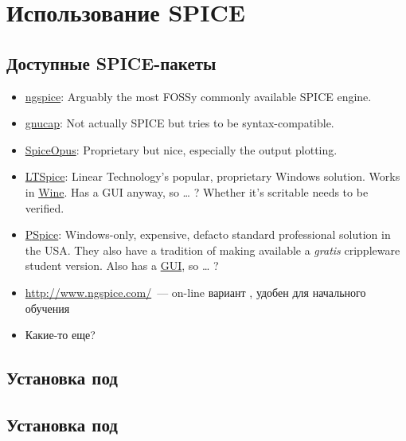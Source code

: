 
\section{Использование SPICE}

\subsection{Доступные SPICE-пакеты}

\begin{itemize}
\item \href{http://ngspice.sourceforge.net/}{ngspice}: Arguably the most FOSSy
commonly available SPICE engine.
\item
\href{https://www.gnu.org/software/gnucap/}{gnucap}:
Not actually SPICE but tries to be syntax-compatible.
\item \href{http://www.spiceopus.si/}{SpiceOpus}: Proprietary but nice,
especially the output plotting.
\item \href{http://www.linear.com/designtools/software/}{LTSpice}: Linear
Technology's popular, proprietary Windows solution.
Works in \href{http://www.winehq.org/}{Wine}. Has a GUI anyway, so … ? Whether
it's scritable needs to be verified.
\item
\href{http://www.cadence.com/products/orcad/pspice_simulation/Pages/default.aspx}{PSpice}:
Windows-only, expensive, defacto standard professional solution in the USA. They
also have a tradition of making available a \emph{gratis} crippleware student
version.
Also has a \underline{GUI}, so … ?
\item \url{http://www.ngspice.com/}\ --- on-line вариант , удобен
для начального обучения
\item Какие-то еще?
\end{itemize}

\subsection{Установка  под \win}


\subsection{Установка  под \linux}

